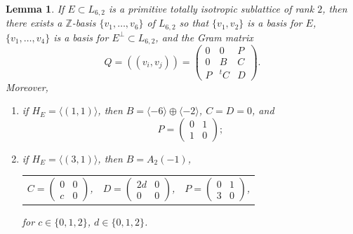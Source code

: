 \documentclass[11pt]{amsart}
\newtheorem{lem}[thm]{Lemma}
\newcommand{\ZZ}{\mathbb{Z}}
\newcommand{\la}{\langle}
\newcommand{\ra}{\rangle}
\newcommand{\op}{\oplus}
\begin{document}
\begin{lem}\label{normalform}
If $E \subset L_{6,2}$ is a primitive totally isotropic sublattice of rank $2$, then there exists a $\ZZ$-basis $\{v_1, \ldots, v_6 \}$ of $L_{6,2}$ so that $\{v_1, v_2 \}$ is a basis for $E$, $\{v_1, \ldots, v_4\}$ is a basis for $E^{\perp} \subset L_{6,2}$, and the Gram matrix 
\begin{equation}\label{normalformeq}
Q = ((v_i, v_j)) = 
\begin{pmatrix} 
0 & 0 & P \\ 
0 & B & C \\ 
P & {}^tC & D 
\end{pmatrix}.
\end{equation}
Moreover,
\begin{enumerate}
\item if $H_E = \la (1,1) \ra$, then  $B = \la -6 \ra \op \la -2 \ra$, $C=D=0$, and  
\begin{equation*}
P = 
\begin{pmatrix}
0 & 1 \\ 
1 & 0 
\end{pmatrix};
\end{equation*}
\item if $H_E = \la (3,1) \ra$, then $B = A_2(-1)$,  
\begin{center}
\begin{tabular}{c c c}
$C = 
\begin{pmatrix}
0 & 0 \\ 
c & 0 
\end{pmatrix}$, 
&
$D = 
\begin{pmatrix}
2d & 0 \\ 
0 & 0 
\end{pmatrix}$,
&
$P = 
\begin{pmatrix}
0 & 1 \\ 
3 & 0 
\end{pmatrix}$,
\end{tabular}
\end{center}
for $c \in \{0,1,2\}$, $d \in \{0,1,2\}$.
\end{enumerate}
\end{lem}
\end{document}
